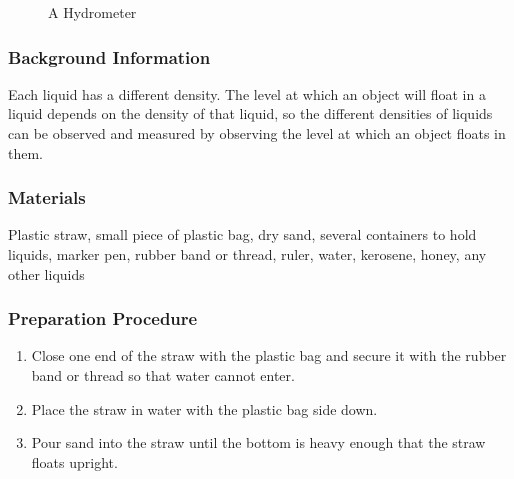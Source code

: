  \begin{figure}
\begin{center}
\def\svgwidth{150pt}

\caption{A Hydrometer}
\label{fig:hydrometer}
\end{center}
\end{figure}

\subsubsection*{Background Information}
Each liquid has a different density. The level at which an object will float in a liquid depends on the density of that liquid, so the different densities of liquids can be observed and measured by observing the level at which an object floats in them.  

\subsubsection*{Materials}
Plastic straw, small piece of plastic bag, dry sand, several containers to hold liquids, marker pen, rubber band or thread, ruler, water, kerosene, honey, any other liquids

\subsubsection*{Preparation Procedure}
\begin{enumerate}
\item{Close one end of the straw with the plastic bag and secure it with the rubber band or thread so that water cannot enter.} 
\item{Place the straw in water with the plastic bag side down.} 
\item{Pour sand into the straw until the bottom is heavy enough that the straw floats upright.} 
\end{enumerate}

